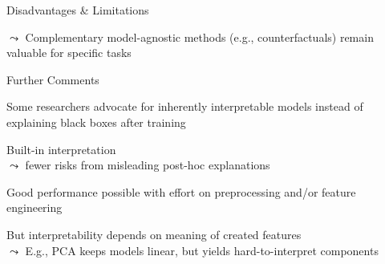 \documentclass[10pt,compress,t,notes=noshow,xcolor=table]{beamer}
\begin{document}
\begin{framev}[align=top]{Disadvantages \& Limitations}
\begin{itemizeM}
$\leadsto$ Complementary model-agnostic methods (e.g., counterfactuals) remain valuable for specific tasks
\end{itemizeM}
\end{framev}


\begin{framev}[align=top]{Further Comments}
\begin{itemizeM}
\item<1-> Some researchers advocate for inherently interpretable models instead of explaining black boxes after training 
\begin{itemizeS}
\item Built-in interpretation\\
$\leadsto$ fewer risks from misleading post-hoc explanations
\item Good performance possible with effort on preprocessing and/or feature engineering
\item But interpretability depends on meaning of created features\\
$\leadsto$ E.g., PCA keeps models linear, but yields hard-to-interpret components
\end{itemizeS}

\end{itemizeM}
\end{framev}
\end{document}
